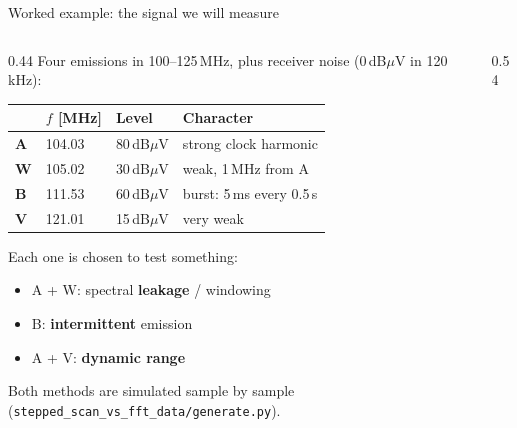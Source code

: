 \documentclass[aspectratio=169]{beamer}
\newcommand{\theorylines}{%
  \foreach \f/\L in {104.03/80, 105.02/30, 111.53/60, 121.01/15} {
    \edef\tmp{\noexpand\draw[black!60, densely dashed]
      (axis cs:\f,-10) -- (axis cs:\f,\L);}
    \tmp
  }
  \addplot[only marks, mark=o, mark size=2.2pt, black, thick]
    coordinates {(104.03,80) (105.02,30) (111.53,60) (121.01,15)};
}
\begin{document}
\begin{frame}{Worked example: the signal we will measure}

\begin{columns}[T]
\begin{column}{0.44\textwidth}
  \footnotesize
  Four emissions in 100--125\,MHz, plus receiver noise (0\,dB$\mu$V in
  120\,kHz):

  \smallskip
  \begin{tabular}{@{}llll@{}}
    \toprule
    & $f$ [MHz] & Level & Character \\
    \midrule
    \textbf{A} & 104.03 & 80\,dB$\mu$V & strong clock harmonic \\
    \textbf{W} & 105.02 & 30\,dB$\mu$V & weak, 1\,MHz from A \\
    \textbf{B} & 111.53 & 60\,dB$\mu$V & \alert{burst}: 5\,ms every 0.5\,s \\
    \textbf{V} & 121.01 & 15\,dB$\mu$V & very weak \\
    \bottomrule
  \end{tabular}

  \medskip
  Each one is chosen to test something:
  \begin{itemize}
    \item A + W: spectral \textbf{leakage} / windowing
    \item B: \textbf{intermittent} emission
    \item A + V: \textbf{dynamic range}
  \end{itemize}

  \smallskip
  \scriptsize Both methods are simulated sample by sample
  (\texttt{stepped\_scan\_vs\_fft\_data/generate.py}).
\end{column}
\begin{column}{0.54\textwidth}


\end{column}
\end{columns}
\end{frame}
\end{document}
